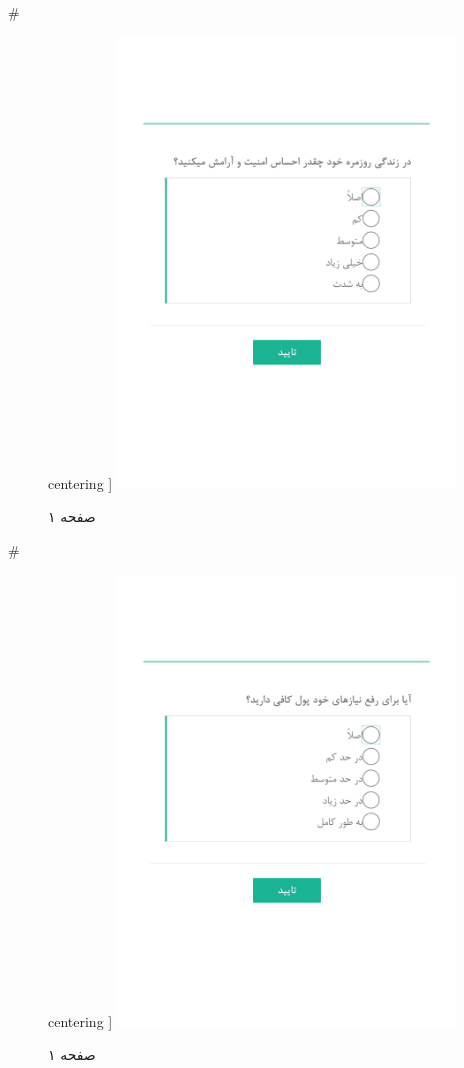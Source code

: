 { 
 # 
\begin{figure}[htpb]
centering ]
\includegraphics[width=0.8\textwidth]{./img/Task16.png/}
\caption{صفحه ۱}
\label{fig:Task1}
\end{figure}
 
 
 # 
\begin{figure}[htpb]
centering ]
\includegraphics[width=0.8\textwidth]{./img/Task17.png/}
\caption{صفحه ۱}
\label{fig:Task1}
\end{figure}
 
}
